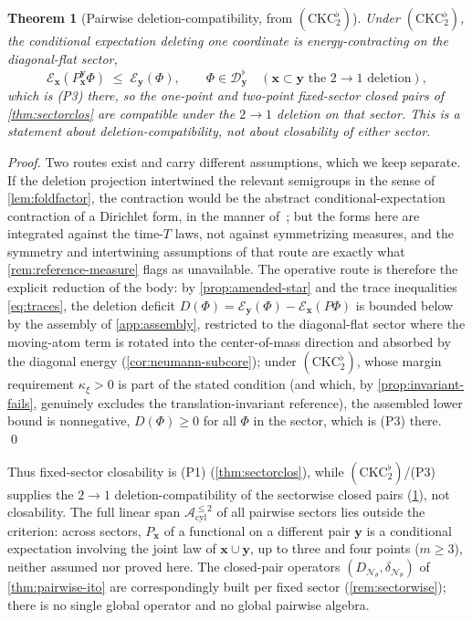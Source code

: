 \documentclass[reqno,final,11pt]{amsart}
\theoremstyle{plain}
\newtheorem{theorem}{Theorem}[section]
\theoremstyle{definition}
\theoremstyle{remark}
\newcommand{\cA}{\mathcal A}
\newcommand{\cD}{\mathcal D}
\newcommand{\cE}{\mathcal E}
\newcommand{\cN}{\mathcal N}
\newcommand{\DN}{D_{\cN_\theta}}
\newcommand{\divN}{\delta_{\cN_\theta}}
\newcommand{\Apair}{\cA^{\le 2}_{\mathrm{cyl}}}
\begin{document}
\begin{theorem}[Pairwise deletion-compatibility, from $(\mathrm{CKC}_2^{\flat})$]\label{thm:deletion}
Under $(\mathrm{CKC}_2^{\flat})$, the conditional expectation deleting one
coordinate is energy-contracting on the diagonal-flat sector,
\[
  \cE_{\mathbf x}(P^{\mathbf y}_{\mathbf x}\Phi)\;\le\;\cE_{\mathbf y}(\Phi),
  \qquad \Phi\in\cD^{\flat}_{\mathbf y}\quad(\mathbf x\subset\mathbf y\text{ the }2\to1\text{ deletion}),
\]
which is \textnormal{(P3)} there, so the one-point and two-point
fixed-sector closed pairs of \cref{thm:sectorclos} are compatible under the
$2\to1$ deletion on that sector. This is a statement about
deletion-compatibility, not about closability of either sector.
\end{theorem}
\begin{proof}
Two routes exist and carry different assumptions, which we keep separate. If
the deletion projection intertwined the relevant semigroups in the sense of
\cref{lem:foldfactor}, the contraction would be the abstract
conditional-expectation contraction of a Dirichlet form, in the manner
of~\citep[Thm.~1.6.1]{FOT}; but the forms here are integrated against the
time-$T$ laws, not against symmetrizing measures, and the symmetry and
intertwining assumptions of that route are exactly what
\cref{rem:reference-measure} flags as unavailable. The operative route is
therefore the explicit reduction of the body: by
\cref{prop:amended-star} and the trace inequalities \eqref{eq:traces}, the
deletion deficit $D(\Phi)=\cE_{\mathbf y}(\Phi)-\cE_{\mathbf x}(P\Phi)$ is
bounded below by the assembly of \cref{app:assembly}, restricted to the
diagonal-flat sector where the moving-atom term is rotated into the
center-of-mass direction and absorbed by the diagonal energy
(\cref{cor:neumann-subcore}); under $(\mathrm{CKC}_2^{\flat})$, whose
margin requirement $\kappa_\xi>0$ is part of the stated condition (and which, by
\cref{prop:invariant-fails}, genuinely excludes the translation-invariant
reference), the assembled lower bound is nonnegative, $D(\Phi)\ge0$ for
all $\Phi$ in the sector, which is \textnormal{(P3)} there. \qed
\end{proof}

Thus fixed-sector closability is \textnormal{(P1)} (\cref{thm:sectorclos}), while
$(\mathrm{CKC}_2^{\flat})$/\textnormal{(P3)} supplies the $2\to1$
deletion-compatibility of the sectorwise closed pairs (\cref{thm:deletion}), not
closability. The full linear span $\Apair$ of all pairwise sectors lies outside the
criterion: across sectors, $P_{\mathbf x}$ of a functional on a different
pair $\mathbf y$ is a conditional expectation involving the joint law of
$\mathbf x\cup\mathbf y$, up to three and four points ($m\ge3$), neither assumed
nor proved here. The closed-pair operators $(\DN,\divN)$ of \cref{thm:pairwise-ito}
are correspondingly built per fixed sector (\cref{rem:sectorwise}); there is
no single global operator and no global pairwise algebra.
\end{document}
